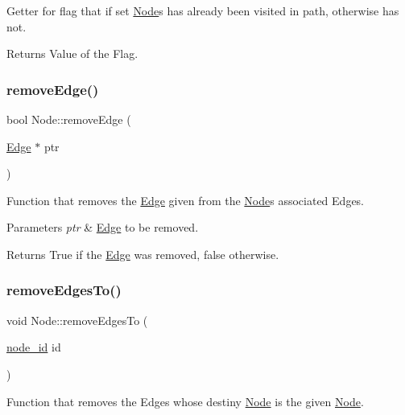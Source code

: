 Getter for flag that if set \hyperlink{class_node}{Node}\textquotesingle{}s has already been visited in path, otherwise has not.

\begin{DoxyReturn}{Returns}
Value of the Flag. 
\end{DoxyReturn}
\hypertarget{class_node_a4c78d9813537ccfc829401f979176428}{}\label{class_node_a4c78d9813537ccfc829401f979176428} 
\subsubsection{\texorpdfstring{remove\+Edge()}{removeEdge()}}
{\footnotesize\ttfamily bool Node\+::remove\+Edge (\begin{DoxyParamCaption}\item[{\hyperlink{class_edge}{Edge} $\ast$}]{ptr }\end{DoxyParamCaption})}

Function that removes the \hyperlink{class_edge}{Edge} given from the \hyperlink{class_node}{Node}\textquotesingle{}s associated Edges.


\begin{DoxyParams}{Parameters}
{\em ptr} & \hyperlink{class_edge}{Edge} to be removed.\\
\hline
\end{DoxyParams}
\begin{DoxyReturn}{Returns}
True if the \hyperlink{class_edge}{Edge} was removed, false otherwise. 
\end{DoxyReturn}
\hypertarget{class_node_a70d6617e33b3fc219f9d3c1bd48d7cca}{}\label{class_node_a70d6617e33b3fc219f9d3c1bd48d7cca} 
\subsubsection{\texorpdfstring{remove\+Edges\+To()}{removeEdgesTo()}}
{\footnotesize\ttfamily void Node\+::remove\+Edges\+To (\begin{DoxyParamCaption}\item[{\hyperlink{_node_8hpp_a9d6265804805c2375068fd7484840dc6}{node\+\_\+id}}]{id }\end{DoxyParamCaption})}

Function that removes the Edges whose destiny \hyperlink{class_node}{Node} is the given \hyperlink{class_node}{Node}.



